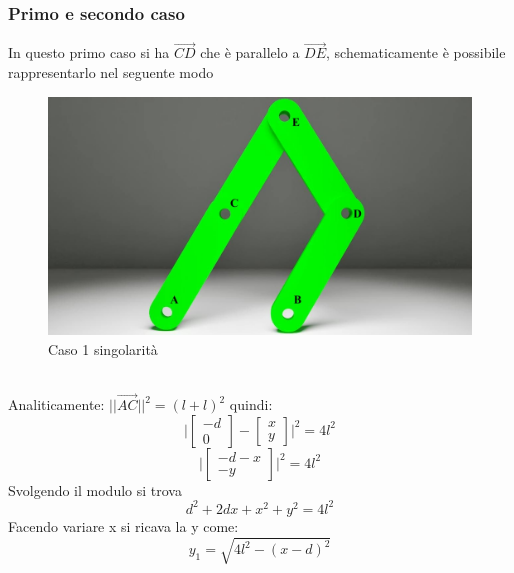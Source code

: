 \subsubsection*{Primo e secondo caso}
In questo primo caso si ha $\overrightarrow{CD}$ che è parallelo a $\overrightarrow{DE}$, schematicamente è possibile rappresentarlo nel seguente modo
\begin{figure}[ht]
	\begin{center}
		\includegraphics[scale=0.3]{Immagini/Singolarity/1}
		\caption{Caso 1 singolarità}
	\end{center}
\end{figure}
\\Analiticamente: $||\overrightarrow{AC}||^2 = (l+l)^2$ quindi: 
\begin{equation*}
	\Bigg| \begin{bmatrix}
		-d  \\ 0
	\end{bmatrix} - \begin{bmatrix}
	x \\ y
\end{bmatrix}\bigg|^2 = 4l^2
\end{equation*}
\begin{equation*}
\bigg|	\begin{bmatrix}
		-d-x \\ -y
	\end{bmatrix}\Bigg|^2 = 4l^2
\end{equation*}
Svolgendo il modulo si trova 
\begin{equation*}
	d^2 + 2dx + x^2 +y^2 = 4l^2
\end{equation*}
Facendo variare x si ricava la y come:
\begin{equation}
    y_1 = \sqrt{4l^2-(x-d)^2}
\end{equation}

